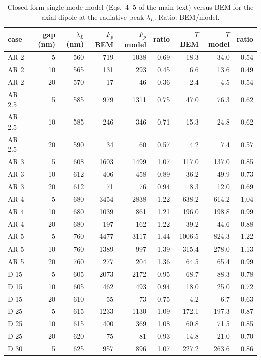 \documentclass[11pt,a4paper]{article}
\newcommand{\Fp}{F_p}
\begin{document}
\begin{table}[h]\centering\small
\caption{Closed-form single-mode model (Eqs.~4--5 of the main text) versus BEM for the axial dipole at the radiative
peak $\lambda_L$. Ratio: BEM/model.}\label{tab:law}
\begin{tabular}{lrrrrrrrr}\toprule
case & gap (nm) & $\lambda_L$ (nm) & $\Fp$ BEM & $\Fp$ model & ratio & $T$ BEM & $T$ model & ratio\\\midrule
AR 2 & 5 & 560 & 719 & 1038 & 0.69 & 18.3 & 34.0 & 0.54\\
AR 2 & 10 & 565 & 131 & 293 & 0.45 & 6.6 & 13.6 & 0.49\\
AR 2 & 20 & 570 & 17 & 46 & 0.36 & 2.4 & 4.5 & 0.54\\
AR 2.5 & 5 & 585 & 979 & 1311 & 0.75 & 47.0 & 76.3 & 0.62\\
AR 2.5 & 10 & 585 & 246 & 346 & 0.71 & 15.3 & 24.8 & 0.62\\
AR 2.5 & 20 & 590 & 34 & 60 & 0.57 & 4.2 & 7.4 & 0.57\\
AR 3 & 5 & 608 & 1603 & 1499 & 1.07 & 117.0 & 137.0 & 0.85\\
AR 3 & 10 & 612 & 406 & 458 & 0.89 & 36.2 & 49.9 & 0.73\\
AR 3 & 20 & 612 & 71 & 76 & 0.94 & 8.3 & 12.0 & 0.69\\
AR 4 & 5 & 680 & 3454 & 2838 & 1.22 & 638.2 & 614.2 & 1.04\\
AR 4 & 10 & 680 & 1039 & 861 & 1.21 & 196.0 & 198.8 & 0.99\\
AR 4 & 20 & 680 & 197 & 162 & 1.22 & 39.2 & 44.6 & 0.88\\
AR 5 & 5 & 760 & 4477 & 3117 & 1.44 & 1006.5 & 824.3 & 1.22\\
AR 5 & 10 & 760 & 1389 & 997 & 1.39 & 315.4 & 278.0 & 1.13\\
AR 5 & 20 & 760 & 277 & 204 & 1.36 & 64.5 & 65.4 & 0.99\\
D 15 & 5 & 605 & 2073 & 2172 & 0.95 & 68.7 & 88.3 & 0.78\\
D 15 & 10 & 605 & 462 & 493 & 0.94 & 18.0 & 25.0 & 0.72\\
D 15 & 20 & 610 & 55 & 73 & 0.75 & 4.2 & 6.7 & 0.63\\
D 25 & 5 & 615 & 1233 & 1130 & 1.09 & 172.1 & 197.3 & 0.87\\
D 25 & 10 & 615 & 400 & 369 & 1.08 & 60.8 & 71.5 & 0.85\\
D 25 & 20 & 620 & 75 & 81 & 0.93 & 14.8 & 21.0 & 0.70\\
D 30 & 5 & 625 & 957 & 896 & 1.07 & 227.2 & 263.6 & 0.86\\

\end{tabular}
\end{table}
\end{document}
